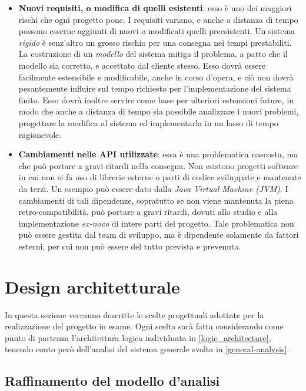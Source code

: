 \documentclass[a4paper,12pt]{report}
\begin{document}
\begin{itemize}
	\item \textbf{Nuovi requisiti, o modifica di quelli esistenti}: esso è uno dei maggiori rischi che ogni progetto pone. I requisiti variano, e anche a distanza di tempo possono esserne aggiunti di nuovi o modificati quelli preesistenti. Un sistema \emph{rigido} è senz'altro un grosso rischio per una consegna nei tempi prestabiliti. La costruzione di un \emph{modello} del sistema mitiga il problema, a patto che il modello sia corretto, e accettato dal cliente stesso. Esso dovrà essere facilmente estensibile e modificabile, anche in corso d'opera, e ciò non dovrà pesantemente influire sul tempo richiesto per l'implementazione del sistema finito. Esso dovrà inoltre servire come base per ulteriori estensioni future, in modo che anche a distanza di tempo sia possibile analizzare i nuovi problemi, progettare la modifica al sistema ed implementarla in un lasso di tempo ragionevole. 
	\item \textbf{Cambiamenti nelle API utilizzate}: essa è una problematica nascosta, ma che può portare a gravi ritardi nella consegna. Non esistono progetti software in cui non si fa uso di librerie esterne o parti di codice sviluppate e mantenute da terzi. Un esempio può essere dato dalla \emph{Java Virtual Machine (JVM)}. I cambiamenti di tali dipendenze, sopratutto se non viene mantenuta la piena retro-compatibilità, può portare a gravi ritardi, dovuti allo studio e alla implementazione \emph{ex-novo} di intere parti del progetto. Tale problematica non può essere gestita dal team di sviluppo, ma è dipendente solamente da fattori esterni, per cui non può essere del tutto prevista e prevenuta.
\end{itemize}

\chapter{Design architetturale} \label{design}

In questa sezione verranno descritte le scelte progettuali adottate per la realizzazione del progetto in esame. Ogni scelta sarà fatta considerando come punto di partenza l'architettura logica individuata in \autoref{logic_architecture}, tenendo conto però dell'analisi del sistema generale svolta in \autoref{general-analysis}.

\section{Raffinamento del modello d'analisi}
\end{document}
